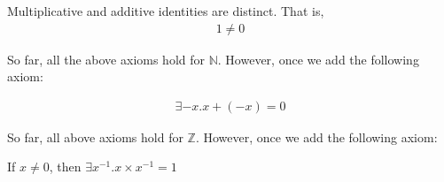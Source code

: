 \documentclass[a4paper]{article}
\theoremstyle{plain}
\theoremstyle{definition}
\newtheorem{axiom}{Axiom}
\theoremstyle{remark}
\begin{document}
\begin{tcolorbox}[colback=black!3!white,colframe=black!60!white,title=\begin{axiom}Distinction \label{Distinction}\end{axiom}]
        Multiplicative and additive identities are distinct. That is,
                \begin{align}
                1 \neq 0
                \end{align}
\end{tcolorbox}
So far, all the above axioms hold for $\mathbb{N}$. However, once we add the following axiom:
\begin{tcolorbox}[colback=black!3!white,colframe=black!60!white,title=\begin{axiom}Additive Inverse \label{Additive Inverse}\end{axiom}]
                \begin{align}
                
        \exists -x.x+(-x)=0
                \end{align}
\end{tcolorbox}
So far, all above axioms hold for $\mathbb{Z}$. However, once we add the following axiom:
\begin{tcolorbox}[colback=black!3!white,colframe=black!60!white,title=\begin{axiom}Multiplicative Inverse \label{Multiplicative Inverse}\end{axiom}]
        If $x \neq 0$, then $\exists x^{-1}.x \times x^{-1}=1$
\end{tcolorbox}
\end{document}
